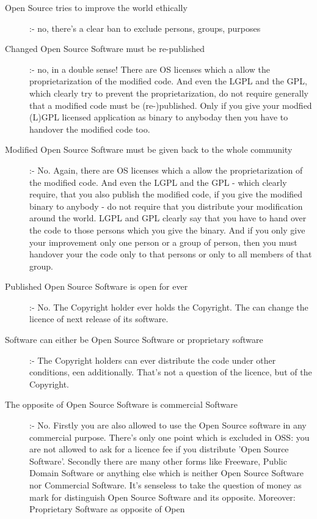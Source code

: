 \begin{description}
  \item[Open Source tries to improve the world ethically] :- no, there's a clear
  ban to exclude persons, groups, purposes
  \item[Changed Open Source Software must be re-published] :- no, in a double
  sense! There are OS licenses which a allow the proprietarization of the
  modified code. And even the LGPL and the GPL, which clearly try to prevent
  the proprietarization, do not require generally that a modified code must be
  (re-)published. Only if you give your modfied (L)GPL licensed application as
  binary to anyboday then you have to handover the modified code too.
  \item[Modified Open Source Software must be given back to the whole community]
  :- No. Again, there are OS licenses which a allow the proprietarization of the
  modified code. And even the LGPL and the GPL - which clearly require, that you
  also publish the modified code, if you give the modified binary to anybody -
  do not require that you distribute your modification around the world. LGPL and
  GPL clearly say that you have to hand over the code to those persons which you
  give the binary. And if you only give your improvement only one person or a
  group of person, then you must handover your the code only to that persons or
  only to all members of that group.
  \item[Published Open Source Software is open for ever] :- No. The Copyright
  holder ever holds the Copyright. The can change the licence of next release of
  its software.
  \item[Software can either be Open Source Software or proprietary software] :-
  The Copyright holders can ever distribute the code under other conditions, een
  additionally. That's not a question of the licence, but of the Copyright.
  \item[The opposite of Open Source Software is commercial Software] :- No.
  Firstly you are also allowed to use the Open Source software in any commercial
  purpose. There's only one point which is excluded in OSS: you are not allowed
  to ask for a licence fee if you distribute 'Open Source Software'. Secondly
  there are many other forms like Freeware, Public Domain Software or anything
  else which is neither Open Source Software nor Commercial Software. It's
  senseless to take the question of money as mark for distinguish Open Source
  Software and its opposite. Moreover: Proprietary Software as opposite of Open

\end{description}

